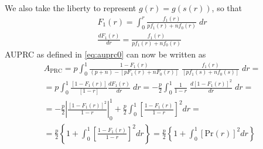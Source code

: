We also take the liberty to represent $g(r) = g(s(r))$, so that
\begin{gather}
    F_1(r) = \int_0^r \frac{f_1(r)}{pf_1(r) + nf_0(r)} \; dr\\
    \frac{d F_1(r)}{dr} = \frac{f_1(r)}{pf_1(r) + nf_0(r)}
\end{gather}
%
AUPRC as defined in \autoref{eq:auprc0} can now be written as
%
\begin{multline}
    A_\text{PRC}
    = p \int_{0}^{1}
        \frac{1 - F_1(r)}{(p+n) - [pF_1(r) + nF_0(r)]}
        \; \frac{f_1(r)}{[pf_1(s) + nf_0(s)]}
    \;dr
    =\\
    = p \int_{0}^{1}
        \frac{[1 - F_1(r)]}{[1 - r]}\frac{d F_1(r)}{dr}
    \;dr
    = -\frac{p}{2} \int_{0}^{1}
        \frac{1}{1 - r}
        \; \frac{d [1 - F_1(r)]^2}{dr}
    \;dr
    =\\
    =
    - \frac{p}{2}
    \left|
        \frac{[1 - F_1(r)]^2}{1 - r}
    \right|_0^1
    + \frac{p}{2}
    \int_{0}^{1}
        \left[\frac{1 - F_1(r)}{1 - r}\right]^2
    dr
    =\\
    =
    \frac{p}{2}
    \left\{
        1 + \int_0^1 \left[\frac{1 - F_1(r)}{1 - r}\right]^2 dr
    \right\}
    =
    \frac{p}{2}
    \left\{
        1 + \int_0^1 [\text{Pr}(r)]^2 dr
    \right\}
    \label{eq:aupr ranks}
\end{multline}
%
%
